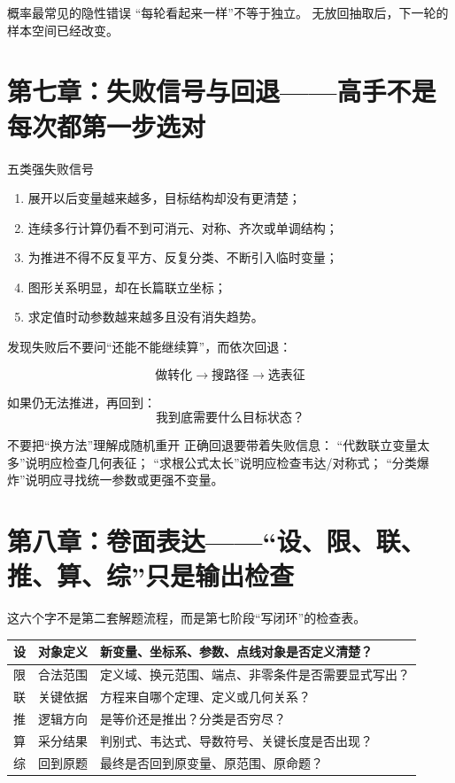 \documentclass[11pt,a4paper]{ctexart}
\begin{document}
\begin{warningbox}{概率最常见的隐性错误}
“每轮看起来一样”不等于独立。
无放回抽取后，下一轮的样本空间已经改变。
\end{warningbox}

\section{第七章：失败信号与回退——高手不是每次都第一步选对}

\begin{corebox}{五类强失败信号}
\begin{enumerate}
  \item 展开以后变量越来越多，目标结构却没有更清楚；
  \item 连续多行计算仍看不到可消元、对称、齐次或单调结构；
  \item 为推进不得不反复平方、反复分类、不断引入临时变量；
  \item 图形关系明显，却在长篇联立坐标；
  \item 求定值时动参数越来越多且没有消失趋势。
\end{enumerate}
\end{corebox}

发现失败后不要问“还能不能继续算”，而依次回退：

\[
\boxed{
\text{做转化}
\rightarrow
\text{搜路径}
\rightarrow
\text{选表征}
}
\]

如果仍无法推进，再回到：
\[
\boxed{\text{我到底需要什么目标状态？}}
\]

\begin{warningbox}{不要把“换方法”理解成随机重开}
正确回退要带着失败信息：
“代数联立变量太多”说明应检查几何表征；
“求根公式太长”说明应检查韦达/对称式；
“分类爆炸”说明应寻找统一参数或更强不变量。
\end{warningbox}

\section{第八章：卷面表达——“设、限、联、推、算、综”只是输出检查}

这六个字不是第二套解题流程，而是第七阶段“写闭环”的检查表。

\begin{longtable}{p{1.6cm}p{4.2cm}p{9.0cm}}
\toprule
设 & 对象定义 & 新变量、坐标系、参数、点线对象是否定义清楚？\\ \hline
限 & 合法范围 & 定义域、换元范围、端点、非零条件是否需要显式写出？\\ \hline
联 & 关键依据 & 方程来自哪个定理、定义或几何关系？\\ \hline
推 & 逻辑方向 & 是等价还是推出？分类是否穷尽？\\ \hline
算 & 采分结果 & 判别式、韦达式、导数符号、关键长度是否出现？\\ \hline
综 & 回到原题 & 最终是否回到原变量、原范围、原命题？\\
\bottomrule
\end{longtable}
\end{document}
